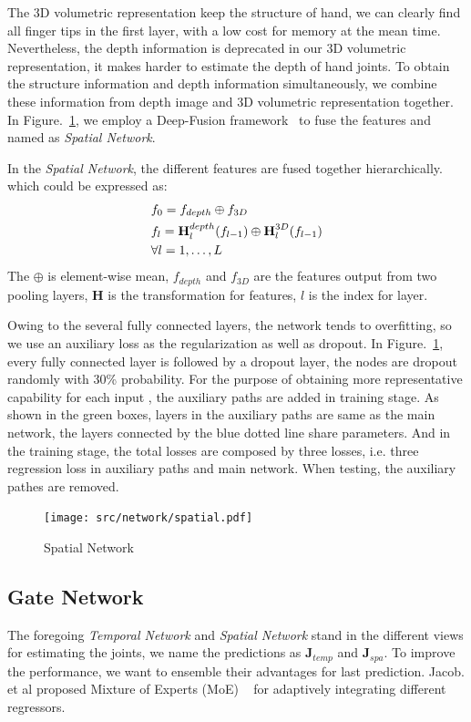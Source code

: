 \documentclass[journal,comsoc]{IEEEtran}
\let\MYoriglatexcaption\caption
\renewcommand{\caption}[2][\relax]{\MYoriglatexcaption[#2]{#2}}
\newcommand{\J}{\textbf{J}}
\begin{document}
The 3D volumetric representation keep the structure of hand, we can clearly find all
finger tips in the first layer, with a low cost for memory at the mean time. Nevertheless,
the depth information is deprecated in our 3D volumetric representation, it makes harder
to estimate the depth of hand joints. To obtain the structure information and depth
information simultaneously, we combine these information from depth image and 3D volumetric
representation together. In Figure.~\ref{fig:spatial network}, we employ a Deep-Fusion
framework~\cite{chen2016multi} to fuse the features and named as \emph{Spatial Network}.

In the \emph{Spatial Network}, the different features are fused together hierarchically.
which could be expressed as:
\begin{equation}\label{eq:deep fusion}
\begin{aligned}
&f_0 = f_{depth} \oplus f_{3D} \\
&f_l = \textbf{H}_l^{depth}(f_{l-1}) \oplus \textbf{H}_l^{3D}(f_{l-1}) \\
&\forall l=1, \dots , L
\vspace{1em}
\end{aligned}
\end{equation}
The $\oplus$ is element-wise mean, $f_{depth}$ and $f_{3D}$ are the features output from
two pooling layers, $\textbf{H}$ is the transformation for features,
$l$ is the index for layer.

Owing to the several fully connected layers, the network tends to overfitting, so we use
an auxiliary loss as the regularization as well as dropout. In Figure.~\ref{fig:spatial network},
every fully connected layer is followed by a dropout layer, the nodes are dropout randomly
with 30\% probability. For the purpose of obtaining more representative capability for each input
, the auxiliary paths are added in training stage. As shown in the green boxes, layers in the
auxiliary paths are same as the main network, the layers connected by the blue dotted line
share parameters. And in the training stage, the total losses are composed by three losses,
i.e. three regression loss in auxiliary paths and main network. When testing, the auxiliary
pathes are removed.
\begin{figure}[t]
    \centering
    \texttt{[image: src/network/spatial.pdf]}
    \caption{Spatial Network}
\label{fig:spatial network}
\end{figure}

\subsection{Gate Network}\label{sec:gate network}
The foregoing \emph{Temporal Network} and \emph{Spatial Network} stand in the different views
for estimating the joints, we name the predictions as $\J_{temp}$ and $\J_{spa}$. To improve
the performance, we want to ensemble their advantages for last prediction. Jacob. et al
proposed Mixture of Experts (MoE) ~\cite{jacobs1991adaptive} for adaptively integrating
different regressors.
\end{document}
